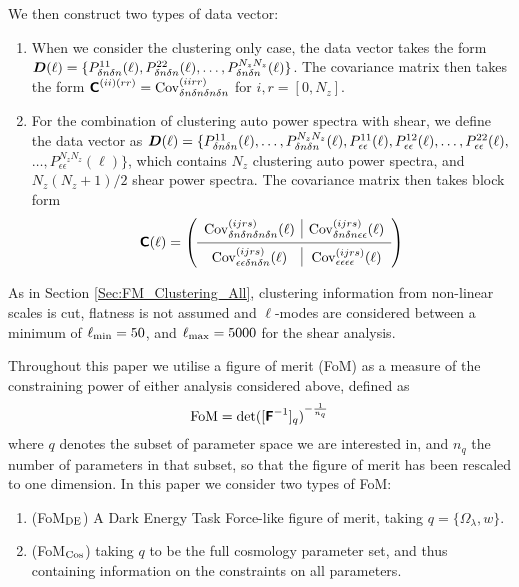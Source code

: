 \documentclass[useAMS,usenatbib,times,letter,amssymb]{mn2e}
\def\be{\begin{equation}}
\def\ee{\end{equation}}
\newcommand{\bm}[1]{\mbox{\boldmath{$#1$}}}   %
\begin{document}
We then construct two types of data vector:
\begin{enumerate}
\item{When we consider the clustering only case, the data vector takes the form $\bm{D}(\ell) = \{P_{\delta n \delta n}^{11}(\ell), P_{\delta n \delta n}^{22}(\ell), \ldots, P_{\delta n \delta n}^{N_z N_z}(\ell)\}$. The covariance matrix then takes the form $\textbf{\textsf{C}}^{(ii)(rr)} = {\rm Cov}_{\delta n\delta n\delta n\delta n}^{(iirr)}$ for $i,r  = [0,N_z]$.}
\item{For the combination of clustering auto power spectra with shear, we define the data vector as $\bm{D}(\ell) = \{P_{\delta n \delta n}^{11}(\ell),  \ldots, P_{\delta n \delta n}^{N_z N_z}(\ell), P_{\epsilon \epsilon}^{11}(\ell), P_{\epsilon \epsilon}^{12}(\ell), \ldots, P_{\epsilon \epsilon}^{22}(\ell),$ $ \ldots, P_{\epsilon \epsilon}^{N_z N_z}(\ell) \}$, which contains $N_z$ clustering auto power spectra, and $N_z(N_z+1)/2$ shear power spectra. The covariance matrix then takes block form
\be
\mathbfss{C}(\ell) = \left(\begin{array}{c|c} {\rm Cov}_{\delta n\delta n\delta n\delta n}^{(ijrs)}(\ell)& {\rm Cov}_{\delta n\delta n\epsilon\epsilon}^{(ijrs)}(\ell)\\\hline  {\rm Cov}_{\epsilon\epsilon\delta n\delta n}^{(ijrs)}(\ell)& {\rm Cov}_{\epsilon\epsilon\epsilon\epsilon}^{(ijrs)}(\ell)\end{array}\right)
\ee
}
\end{enumerate}

 As in Section \ref{Sec:FM_Clustering_All}, clustering information from non-linear scales is cut, flatness is not assumed and $\ell$-modes are considered between a minimum of $\ell_{\rm min} = 50$, and $\ell_{\rm max} = 5000$ for the shear analysis.

Throughout this paper we utilise a figure of merit (FoM) as a measure of the constraining power of either analysis considered above, defined as
\be
{\rm FoM} = {{{\rm det}([\mathbfss{F}^{-1}]_q)}}^{-\frac{1}{n_q}}
\ee
where $q$ denotes the subset of parameter space we are interested in, and $n_q$ the number of parameters in that subset, so that the figure of merit has been rescaled to one dimension. In this paper we consider two types of FoM:

\begin{enumerate}
\item{(FoM$_{\rm DE}$) A Dark Energy Task Force-like figure of merit, taking $q=\{\Omega_{\lambda},w\}$.}
\item{(FoM$_{\rm Cos}$) taking $q$ to be the full cosmology parameter set, and thus containing information on the constraints on all parameters.}
\end{enumerate}
\end{document}
